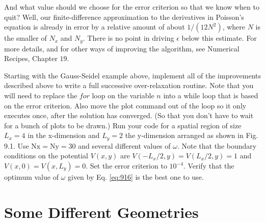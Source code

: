 And what value should we choose for the error criterion so that we know when to quit? Well, our finite-difference approximation to the derivatives in Poisson\rq s equation is already in error by a relative amount of about $1 /\left(12 N^{2}\right)$, where $N$ is the smaller of $N_{x}$ and $N_{y}$. There is no point in driving $\epsilon$ below this estimate. For more details, and for other ways of improving the algorithm, see Numerical Recipes, Chapter $19 .$

\begin{problem}\label{P9.5}
Starting with the Gauss-Seidel example above, implement all of the improvements described above to write a full successive over-relaxation routine. Note that you will need to replace the $for$ loop on the variable $n$ into a while loop that is based on the error criterion. Also move the plot command out of the loop so it only executes once, after the solution has converged. (So that you don\rq t have to wait for a bunch of plots to be drawn.) Run your code for a spatial region of size $L_{x}=4$ in the x-dimension and $L_{y}=2$ the $\mathrm{y}$-dimension arranged as shown in Fig. 9.1. Use $\mathrm{Nx}=\mathrm{Ny}=30$ and several different values of $\omega$. Note that the boundary conditions on the potential $V(x, y)$ are $V\left(-L_{x} / 2, y\right)=V\left(L_{x} / 2, y\right)=1$ and $V(x, 0)=V\left(x, L_{y}\right)=0$. Set the error criterion to $10^{-4}$. Verify that the optimum value of $\omega$ given by Eq. \eqref{eq:916} is the best one to use.
\end{problem}

\section*{Some Different Geometries}


